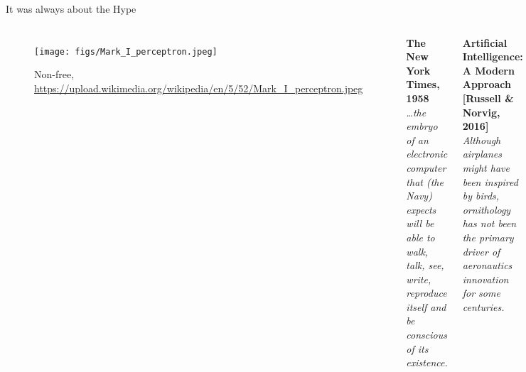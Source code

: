 \documentclass[compress,ignorenonframetext,aspectratio=1610]{beamer}
\begin{document}
\begin{frame}{It was always about the Hype}
	\begin{columns}

			\begin{figure}
				\texttt{[image: figs/Mark\_I\_perceptron.jpeg]} 	
				\caption{\tiny{Non-free, \url{https://upload.wikimedia.org/wikipedia/en/5/52/Mark_I_perceptron.jpeg}}}

			\end{figure}


		\textbf{The New York Times, 1958} \\
		
		\textit{\dots the embryo of an electronic computer that (the Navy) expects will be able to walk, talk, see, write, reproduce itself and be conscious of its existence.}
		\pause


		
		\textbf{Artificial Intelligence: A Modern Approach [Russell  \& Norvig, 2016]} \\

		\textit{Although airplanes might have been inspired by birds, ornithology has not been the primary driver of aeronautics innovation for some centuries.}
		\vspace{1em}

		\pause

		\textbf{Dive Deep into Deep Learning [Zhang, Aston, 2021]}\\
		\textit{Likewise, inspiration in deep learning these days comes in equal or greater measure from mathematics, statistics, and computer science.}
		
		\end{columns}
\end{frame}
\end{document}
